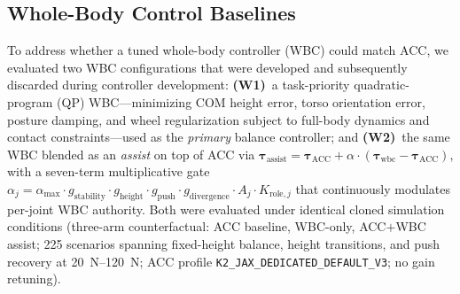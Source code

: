 
\subsection{Whole-Body Control Baselines}
\label{sec:wbc}

To address whether a tuned whole-body controller (WBC) could match ACC, we evaluated two WBC configurations that were developed and subsequently discarded during controller development:
\textbf{(W1)}~a task-priority quadratic-program (QP) WBC---minimizing COM height error, torso orientation error, posture damping, and wheel regularization subject to full-body dynamics and contact constraints---used as the \emph{primary} balance controller; and
\textbf{(W2)}~the same WBC blended as an \emph{assist} on top of ACC via $\boldsymbol{\tau}_{\text{assist}} = \boldsymbol{\tau}_{\text{ACC}} + \alpha\!\cdot\!(\boldsymbol{\tau}_{\text{wbc}} - \boldsymbol{\tau}_{\text{ACC}})$, with a seven-term multiplicative gate $\alpha_{\!j} = \alpha_{\max}\!\cdot\!g_{\text{stability}}\!\cdot\!g_{\text{height}}\!\cdot\!g_{\text{push}}\!\cdot\!g_{\text{divergence}}\!\cdot\!A_j\!\cdot\!K_{\text{role},j}$ that continuously modulates per-joint WBC authority.
Both were evaluated under identical cloned simulation conditions (three-arm counterfactual: ACC baseline, WBC-only, ACC$+$WBC assist; 225 scenarios spanning fixed-height balance, height transitions, and push recovery at \SIrange{20}{120}{N}; ACC profile \texttt{K2\_JAX\_DEDICATED\_DEFAULT\_V3}; no gain retuning).

